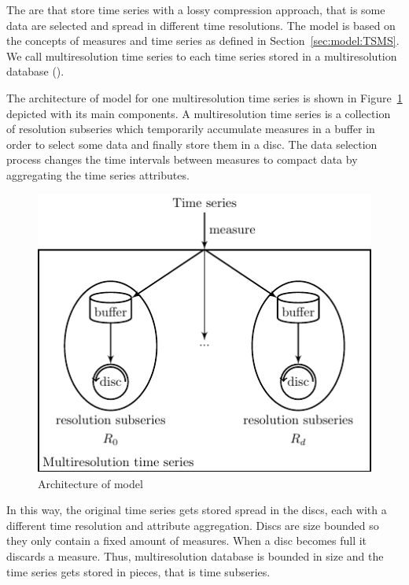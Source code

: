 The  are  that store time series with a lossy
compression approach, that is some data are selected and spread
in different time resolutions. The  model is based on the
concepts of measures and time series as defined in
Section~\ref{sec:model:TSMS}. We call multiresolution time series
to each time series stored in a multiresolution database
().


The architecture of  model for one multiresolution time series is
shown in Figure~\ref{fig:model:mtsdb} depicted with its main
components.  A multiresolution time series is a collection of
resolution subseries which temporarily accumulate measures in a buffer
in order to select some data and finally store them in a
disc. The data selection process changes the time intervals
between measures to compact data by aggregating the time series
attributes.

\begin{figure}
  \centering
  \includegraphics{fig_model_mtsdb.pdf}
  \caption{Architecture of  model}
  \label{fig:model:mtsdb}
\end{figure}


In this way, the original time series gets stored spread in the discs,
each with a different time resolution and attribute aggregation.
Discs are size bounded so they only contain a fixed amount of
measures. When a disc becomes full it discards a measure. Thus,
multiresolution database is bounded in size and the time series gets
stored in pieces, that is time subseries.

